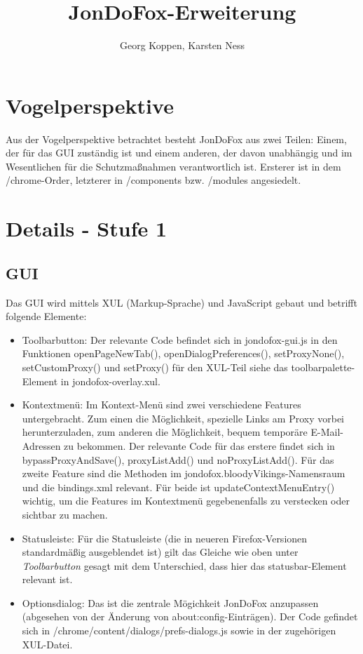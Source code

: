 \documentclass[a4paper,10pt]{scrartcl}
\title{JonDoFox-Erweiterung}
\author{Georg Koppen, Karsten Ness}
\begin{document}
  \maketitle
  \section{Vogelperspektive}
  Aus der Vogelperspektive betrachtet besteht JonDoFox aus zwei Teilen: Einem,
  der für das GUI zuständig ist und einem anderen, der davon unabhängig und im
  Wesentlichen für die Schutzmaßnahmen verantwortlich ist.
  Ersterer ist in dem /chrome-Order, letzterer in /components bzw. /modules
  angesiedelt.
  \section{Details - Stufe 1}
    \subsection{GUI}
      Das GUI wird mittels XUL (Markup-Sprache) und JavaScript gebaut und
      betrifft folgende Elemente:
      \begin{itemize}
        \item Toolbarbutton: Der relevante Code befindet sich in jondofox-gui.js
          in den Funktionen openPageNewTab(), openDialogPreferences(),
          setProxyNone(), setCustomProxy() und setProxy() für den XUL-Teil siehe
          das toolbarpalette-Element in jondofox-overlay.xul.
        \item Kontextmenü: Im Kontext-Menü sind zwei verschiedene Features
          untergebracht. Zum einen die Möglichkeit, spezielle Links am Proxy
          vorbei herunterzuladen, zum anderen die Möglichkeit, bequem temporäre
          E-Mail-Adressen zu bekommen. Der relevante Code für das erstere findet
          sich in bypassProxyAndSave(), proxyListAdd() und
          noProxyListAdd(). Für das zweite Feature sind die Methoden im
          jondofox.bloodyVikings-Namensraum und die bindings.xml relevant. Für
          beide ist updateContextMenuEntry() wichtig, um die Features im
          Kontextmenü gegebenenfalls zu verstecken oder sichtbar zu machen.
        \item Statusleiste: Für die Statusleiste (die in neueren
          Firefox-Versionen standardmäßig ausgeblendet ist) gilt das Gleiche wie
          oben unter \textit{Toolbarbutton} gesagt mit dem Unterschied, dass
          hier das statusbar-Element relevant ist.
        \item Optionsdialog: Das ist die zentrale Mögichkeit JonDoFox anzupassen
          (abgesehen von der Änderung von about:config-Einträgen). Der Code
          gefindet sich in /chrome/content/dialogs/prefs-dialogs.js sowie in der
          zugehörigen XUL-Datei.
      \end{itemize}
\end{document}
